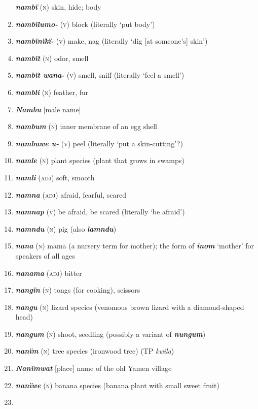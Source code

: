 \begin{enumerate}[noitemsep, label={}, align=left, widest=190, labelsep=1ex,leftmargin=*,itemindent=-10pt]
\textbf{\textit{nambï}} (\textsc{n}) skin, hide; body \item 
\textbf{\textit{nambïlumo-}} (\textsc{v}) block (literally ‘put body’) \item 
\textbf{\textit{nambïnïkï-}} (\textsc{v}) make, nag (literally ‘dig [at someone’s] skin’) \item 
\textbf{\textit{nambït}} (\textsc{n}) odor, smell \item 
\textbf{\textit{nambït wana-}} (\textsc{v}) smell, sniff (literally ‘feel a smell’) \item 
\textbf{\textit{nambli}} (\textsc{n}) feather, fur \item 
\textbf{\textit{Nambu}} [male name] \item 
\textbf{\textit{nambum}} (\textsc{n}) inner membrane of an egg shell \item 
\textbf{\textit{nambuwe u-}} (\textsc{v}) peel (literally ‘put a skin-cutting’?) \item 
\textbf{\textit{namle}} (\textsc{n}) plant species (plant that grows in swamps) \item 
\textbf{\textit{namli}} (\textsc{adj}) soft, smooth \item 
\textbf{\textit{namna}} (\textsc{adj}) afraid, fearful, scared \item 
\textbf{\textit{namnap}} (\textsc{v}) be afraid, be scared (literally ‘be afraid’) \item 
\textbf{\textit{namndu}} (\textsc{n}) pig (also \textbf{\textit{lamndu}}) \item 
\textbf{\textit{nana}} (\textsc{n}) mama (a nursery term for mother); the  form of \textbf{\textit{inom}} ‘mother’ for speakers of all ages \item 
\textbf{\textit{nanama}} (\textsc{adj}) bitter \item 
\textbf{\textit{nangïn}} (\textsc{n}) tongs (for cooking), scissors \item 
\textbf{\textit{nangu}} (\textsc{n}) lizard species (venomous brown lizard with a diamond-shaped head) \item 
\textbf{\textit{nangum}} (\textsc{n}) shoot, seedling (possibly a variant of \textbf{\textit{nungum}}) \item 
\textbf{\textit{nanïm}} (\textsc{n}) tree species (ironwood tree) (TP \textit{kwila}) \item 
\textbf{\textit{Nanïmwat}} [place] name of the old Yamen village \item 
\textbf{\textit{nanïwe}} (\textsc{n}) banana species (banana plant with small sweet fruit) \item 

\end{enumerate}
